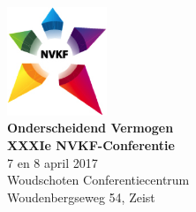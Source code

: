 \documentclass[a4paper,10pt]{report}
\begin{document}
\begin{multicols*}{3}
\noindent
\begin{center}
\includegraphics[width=3cm]{nvkf_logo}\\
{\bfseries Onderscheidend Vermogen}\\ \vspace{0.10cm} 
{\bfseries XXXIe NVKF-Conferentie}\\ \vspace{0.10cm}
{7 en 8 april 2017}\\ \vspace{0.15cm}
{Woudschoten Conferentiecentrum}\\
{Woudenbergseweg 54, Zeist}
\end{center}
\vfill



\end{multicols*}
\end{document}
